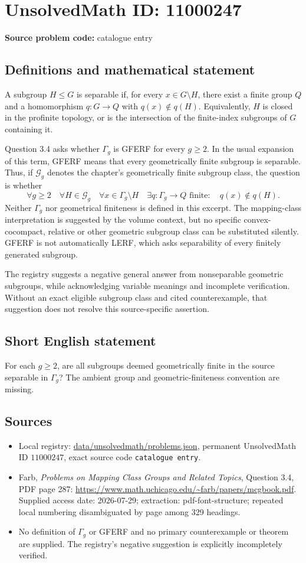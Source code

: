\documentclass[11pt]{article}
\begin{document}
\section*{UnsolvedMath ID: 11000247}
\textbf{Source problem code:} catalogue entry
\subsection{Definitions and mathematical statement}
A subgroup $H\leq G$ is separable if, for every $x\in G\setminus H$, there exist a finite group $Q$ and a homomorphism $q:G\to Q$ with $q(x)\notin q(H)$. Equivalently, $H$ is closed in the profinite topology, or is the intersection of the finite-index subgroups of $G$ containing it.

Question 3.4 asks whether $\Gamma_g$ is GFERF for every $g\geq2$. In the usual expansion of this term, GFERF means that every geometrically finite subgroup is separable. Thus, if $\mathcal G_g$ denotes the chapter's geometrically finite subgroup class, the question is whether
\[
 \forall g\geq2\quad\forall H\in\mathcal G_g\quad
 \forall x\in\Gamma_g\setminus H\quad
 \exists q:\Gamma_g\to Q\text{ finite}:\quad q(x)\notin q(H).
\]
Neither $\Gamma_g$ nor geometrical finiteness is defined in this excerpt. The mapping-class interpretation is suggested by the volume context, but no specific convex-cocompact, relative or other geometric subgroup class can be substituted silently. GFERF is not automatically LERF, which asks separability of every finitely generated subgroup.

The registry suggests a negative general answer from nonseparable geometric subgroups, while acknowledging variable meanings and incomplete verification. Without an exact eligible subgroup class and cited counterexample, that suggestion does not resolve this source-specific assertion.
\subsection{Short English statement}
For each $g\geq2$, are all subgroups deemed geometrically finite in the source separable in $\Gamma_g$? The ambient group and geometric-finiteness convention are missing.
\subsection{Sources}
\begin{itemize}
\item Local registry: \url{data/unsolvedmath/problems.json}, permanent UnsolvedMath ID $11000247$, exact source code \texttt{catalogue entry}.
\item Farb, \emph{Problems on Mapping Class Groups and Related Topics}, Question 3.4, PDF page 287: \url{https://www.math.uchicago.edu/~farb/papers/mcgbook.pdf}. Supplied access date: 2026-07-29; extraction: pdf-font-structure; repeated local numbering disambiguated by page among 329 headings.
\item No definition of $\Gamma_g$ or GFERF and no primary counterexample or theorem are supplied. The registry's negative suggestion is explicitly incompletely verified.
\end{itemize}
\end{document}
